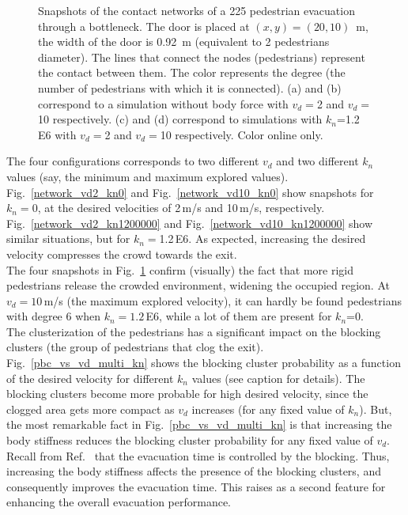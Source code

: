 \documentclass[preprint,12pt]{elsarticle}
\begin{document}
\begin{figure}[!htbp]
\caption[width=0.47\columnwidth]{Snapshots of the contact networks of a 225 pedestrian evacuation through a bottleneck. The door is placed at $(x,y)=(20,10)$~m, the width of the door is 0.92~m (equivalent to 2 pedestrian\textsc{}s diameter). The lines that connect the nodes (pedestrians) represent the contact between them. The color represents the degree (the number of pedestrians with which it is connected). (a) and (b) correspond to a simulation without body force with $v_d=$2 and $v_d=$10 respectively. (c) and (d) correspond to simulations with $k_n$=1.2\,E6 with $v_d=$2 and $v_d=$10 respectively. Color online only.}
\label{network_bottleneck}
\end{figure}



The four configurations corresponds to two different $v_d$ and two different $k_n$ values (say, the  minimum and maximum explored values). Fig.~\ref{network_vd2_kn0} and Fig.~\ref{network_vd10_kn0} show snapshots for $k_n=0$, at the desired velocities of 2$\,$m/s and 10$\,$m/s, respectively.    Fig.~\ref{network_vd2_kn1200000} and Fig.~\ref{network_vd10_kn1200000} show similar situations, but for  $k_n=$1.2$\,$E6. As expected, increasing the desired velocity compresses the crowd towards the exit. \\

The four snapshots in Fig.~\ref{network_bottleneck} confirm (visually) the fact that more rigid pedestrians release the crowded environment, widening the occupied region. At $v_d=10\,$m/s (the maximum explored velocity), it can hardly be found pedestrians with degree 6 when $k_n=1.2\,$E6, while a lot of them are present for $k_n$=0.\\

The clusterization of the pedestrians has a significant impact on the blocking clusters (the group of pedestrians that clog the exit).  Fig.~\ref{pbc_vs_vd_multi_kn} shows the blocking cluster probability as a function of the desired velocity for different $k_n$ values (see caption for details). The blocking clusters become more probable for high desired velocity, since the clogged area gets more compact as $v_d$ increases (for any fixed value of $k_n$). But, the most remarkable fact in Fig.~\ref{pbc_vs_vd_multi_kn} is that increasing the body stiffness reduces the blocking cluster probability for any fixed value of $v_d$. Recall from Ref.~\cite{dorso_2005} that the evacuation time is controlled by the blocking. Thus, increasing the body stiffness affects the presence of the blocking clusters, and consequently improves the evacuation time. This raises as a second feature for enhancing the overall evacuation performance. \\
\end{document}
